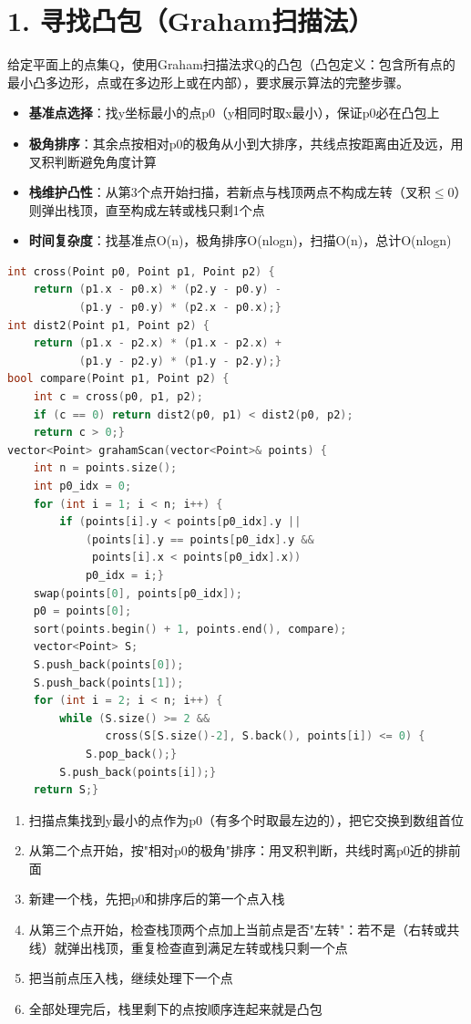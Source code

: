 \section*{1. 寻找凸包（Graham扫描法）}

给定平面上的点集Q，使用Graham扫描法求Q的凸包（凸包定义：包含所有点的最小凸多边形，点或在多边形上或在内部），要求展示算法的完整步骤。

\begin{itemize}
    \item \textbf{基准点选择}：找y坐标最小的点p0（y相同时取x最小），保证p0必在凸包上
    \item \textbf{极角排序}：其余点按相对p0的极角从小到大排序，共线点按距离由近及远，用叉积判断避免角度计算
    \item \textbf{栈维护凸性}：从第3个点开始扫描，若新点与栈顶两点不构成左转（叉积$\le 0$）则弹出栈顶，直至构成左转或栈只剩1个点
    \item \textbf{时间复杂度}：找基准点O(n)，极角排序O(nlogn)，扫描O(n)，总计O(nlogn)
\end{itemize}

\begin{lstlisting}[language=C++, style=cppstyle]
int cross(Point p0, Point p1, Point p2) {
    return (p1.x - p0.x) * (p2.y - p0.y) -
           (p1.y - p0.y) * (p2.x - p0.x);}
int dist2(Point p1, Point p2) {
    return (p1.x - p2.x) * (p1.x - p2.x) +
           (p1.y - p2.y) * (p1.y - p2.y);}
bool compare(Point p1, Point p2) {
    int c = cross(p0, p1, p2);
    if (c == 0) return dist2(p0, p1) < dist2(p0, p2);
    return c > 0;}
vector<Point> grahamScan(vector<Point>& points) {
    int n = points.size();
    int p0_idx = 0;
    for (int i = 1; i < n; i++) {
        if (points[i].y < points[p0_idx].y ||
            (points[i].y == points[p0_idx].y &&
             points[i].x < points[p0_idx].x))
            p0_idx = i;}
    swap(points[0], points[p0_idx]);
    p0 = points[0];
    sort(points.begin() + 1, points.end(), compare);
    vector<Point> S;
    S.push_back(points[0]);
    S.push_back(points[1]);
    for (int i = 2; i < n; i++) {
        while (S.size() >= 2 &&
               cross(S[S.size()-2], S.back(), points[i]) <= 0) {
            S.pop_back();}
        S.push_back(points[i]);}
    return S;}
\end{lstlisting}

\begin{enumerate}
    \item 扫描点集找到y最小的点作为p0（有多个时取最左边的），把它交换到数组首位
    \item 从第二个点开始，按"相对p0的极角"排序：用叉积判断，共线时离p0近的排前面
    \item 新建一个栈，先把p0和排序后的第一个点入栈
    \item 从第三个点开始，检查栈顶两个点加上当前点是否"左转"：若不是（右转或共线）就弹出栈顶，重复检查直到满足左转或栈只剩一个点
    \item 把当前点压入栈，继续处理下一个点
    \item 全部处理完后，栈里剩下的点按顺序连起来就是凸包
\end{enumerate}
